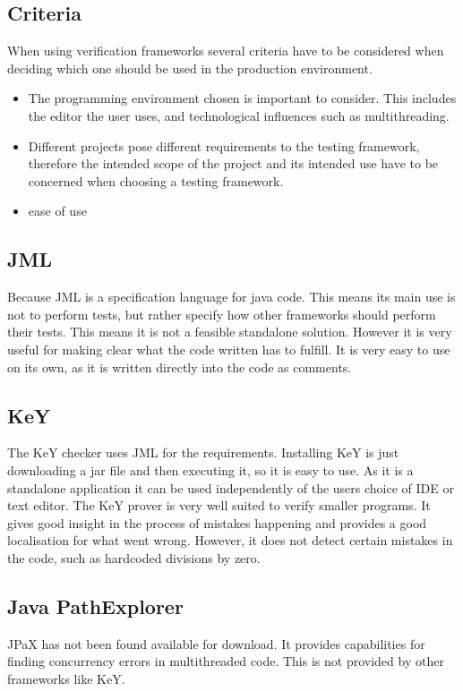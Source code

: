 \subsection{Criteria}
When using verification frameworks several criteria have to be considered when deciding which one should be used in the production environment.
\begin{itemize}
	\item The programming environment chosen is important to consider. This includes the editor the user uses, and technological influences such as multithreading. 
	\item Different projects pose different requirements to the testing framework, therefore the intended scope of the project and its intended use have to be concerned when choosing a testing framework.
	\item ease of use
\end{itemize}

\subsection{JML}
Because JML is a specification language for java code. This means its main use is not to perform tests, but rather specify how other frameworks should perform their tests. This means it is not a feasible standalone solution. However it is very useful for making clear what the code written has to fulfill. It is very easy to use on its own, as it is written directly into the code as comments.
\subsection{KeY}
The KeY checker uses JML for the requirements. Installing KeY is just downloading a jar file and then executing it, so it is easy to use. As it is a standalone application it can be used independently of the users choice of IDE or text editor. The KeY prover is very well suited to verify smaller programs. It gives good insight in the process of mistakes happening and provides a good localisation for what went wrong. However, it does not detect certain mistakes in the code, such as hardcoded divisions by zero.  
\subsection{Java PathExplorer}
JPaX has not been found available for download. It provides capabilities for finding concurrency errors in multithreaded code. This is not provided by other frameworks like KeY. 

